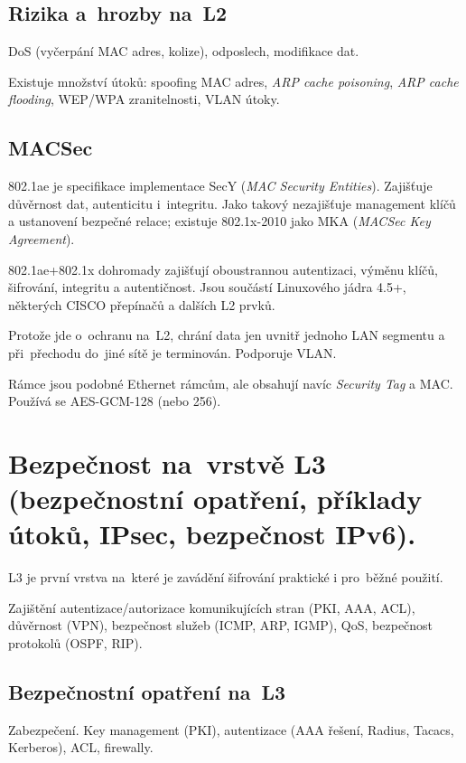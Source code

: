 \subsection{Rizika a~hrozby na~L2}

DoS (vyčerpání MAC adres, kolize), odposlech, modifikace dat.

Existuje množství útoků: spoofing MAC adres, \emph{ARP cache poisoning}, \emph{ARP cache flooding}, WEP/WPA zranitelnosti, VLAN útoky.



\subsection{MACSec}

802.1ae je specifikace implementace SecY (\emph{MAC Security Entities}).
Zajišťuje důvěrnost dat, autenticitu i~integritu.
Jako takový nezajišťuje management klíčů a ustanovení bezpečné relace; existuje 802.1x-2010 jako MKA (\emph{\mbox{MACSec} Key Agreement}).

802.1ae+802.1x dohromady zajišťují oboustrannou autentizaci, výměnu klíčů, šifrování, integritu a autentičnost.
Jsou součástí Linuxového jádra 4.5+, některých CISCO přepínačů a dalších L2 prvků.

Protože jde o~ochranu na~L2, chrání data jen uvnitř jednoho LAN segmentu a při~přechodu do~jiné sítě je terminován.
Podporuje VLAN.

Rámce jsou podobné Ethernet rámcům, ale obsahují navíc \emph{Security Tag} a MAC.
Používá se AES-GCM-128 (nebo 256).


\clearpage
\section{Bezpečnost na~vrstvě L3 (bezpečnostní opatření, příklady útoků, IPsec, bezpečnost IPv6).}

L3 je první vrstva na~které je zavádění šifrování praktické i pro~běžné použití.

Zajištění autentizace/autorizace komunikujících stran (PKI, AAA, ACL), důvěrnost (VPN), bezpečnost služeb (ICMP, ARP, IGMP), QoS, bezpečnost protokolů (OSPF, RIP).


\subsection{Bezpečnostní opatření na~L3}

Zabezpečení.
Key management (PKI), autentizace (AAA řešení, Radius, Tacacs, Kerberos), ACL, firewally.

